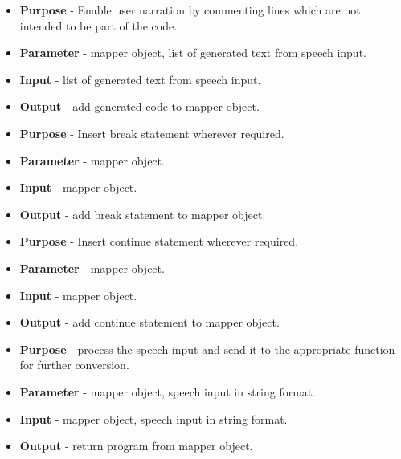 \documentclass[12pt]{article}
\newcounter{subsubsubsection}[subsubsection]
\begin{document}
\begin{itemize}
    \setlength{\itemsep}{1pt}
    \item \textbf{Purpose} - Enable user narration by commenting lines which are not intended to be part of the code.
    \item \textbf{Parameter} - mapper object, list of generated text from speech input.
    \item \textbf{Input} -  list of generated text from speech input.
    \item \textbf{Output} - add generated code to mapper object.
\end{itemize}

\begin{itemize}
    \setlength{\itemsep}{1pt}
    \item \textbf{Purpose} - Insert break statement wherever required.
    \item \textbf{Parameter} - mapper object.
    \item \textbf{Input} -  mapper object.
    \item \textbf{Output} - add break statement to mapper object.
\end{itemize}

\begin{itemize}
    \setlength{\itemsep}{1pt}
    \item \textbf{Purpose} -  Insert continue statement wherever required.
    \item \textbf{Parameter} - mapper object.
    \item \textbf{Input} -  mapper object.
    \item \textbf{Output} - add continue statement to mapper object.
\end{itemize}

\begin{itemize}
    \setlength{\itemsep}{1pt}
    \item \textbf{Purpose} - process the speech input and send it to the appropriate function for further conversion.
    \item \textbf{Parameter} - mapper object, speech input in string format.
    \item \textbf{Input} - mapper object,  speech input in string format.
    \item \textbf{Output} - return program from mapper object.
\end{itemize}
\end{document}
